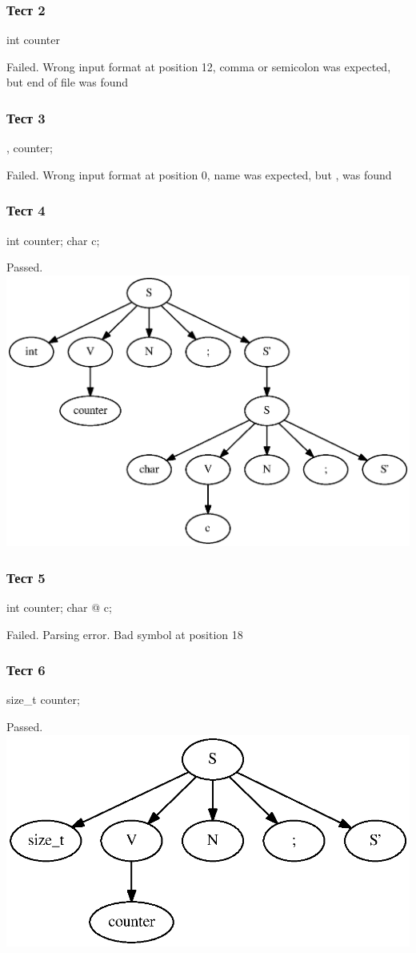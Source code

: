 \subsubsection{Тест 2}
int counter

Failed.
Wrong input format at position 12, comma or semicolon was expected, but end of file was found

\subsubsection{Тест 3}
, counter;

Failed.
Wrong input format at position 0, name was expected, but , was found

\subsubsection{Тест 4}
int counter; char c;

Passed.
\includegraphics[width=\textwidth]{graph4.eps}

\subsubsection{Тест 5}
int counter; char @ c;

Failed.
Parsing error. Bad symbol at position 18

\subsubsection{Тест 6}
size\_t counter;

Passed.
\includegraphics[width=\textwidth]{graph6.eps}

